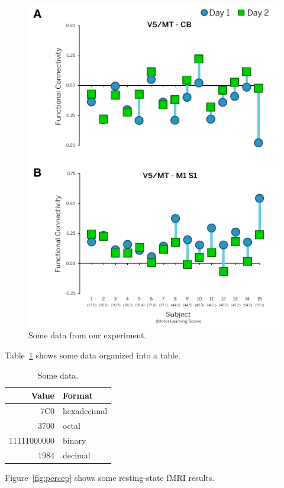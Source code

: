 \documentclass[twocolumn]{preep}
\begin{document}
\begin{figure}
  \centering
  \includegraphics[width=0.95\columnwidth]{figure.pdf}
  \caption{Some data from our experiment.}
  \label{fig:subjectmeans}
\end{figure}    

Table~\ref{tab:randomjunk} shows some data organized into a table.

\begin{table}
  \centering
  \begin{tabular}{|r|l|}
    \hline
    \textbf{Value} & \textbf{Format}\\
    \hline\hline
  7C0 & hexadecimal \\
  3700 & octal \\ \cline{2-2}
  11111000000 & binary \\
  \hline
  1984 & decimal \\
  \hline
  \end{tabular}
  \caption{Some data.}
  \label{tab:randomjunk}
\end{table}

Figure~\ref{fig:percep} shows some resting-state fMRI results.
\end{document}
